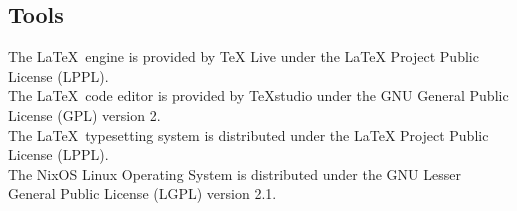 \documentclass[a4paper,12pt]{article}
\begin{document}
	\subsection{Tools}
	The \LaTeX\, engine is provided by TeX Live under the LaTeX Project Public License (LPPL).\\
	
	The \LaTeX\, code editor is provided by TeXstudio under the GNU General Public License (GPL) version 2.\\
	
	The \LaTeX\, typesetting system is distributed under the LaTeX Project Public License (LPPL).\\
	
	The NixOS Linux Operating System is distributed under the GNU Lesser General Public License (LGPL) version 2.1.\\
	
	
\end{document}

